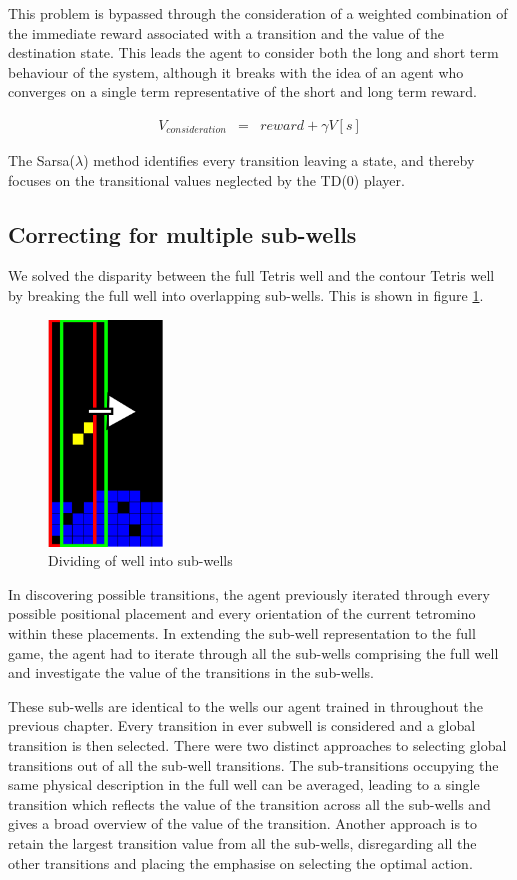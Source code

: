 \documentclass{rucsthesis}
\begin{document}
This problem is bypassed through the consideration of a weighted combination of the immediate reward associated with a transition and the value of the destination state. This leads the agent to consider both the long and short term behaviour of the system, although it breaks with the idea of an agent who converges on a single term representative of the short and long term reward.

\begin{eqnarray*}
V_{consideration} & = & reward + \gamma V[s]
\end{eqnarray*} 
 
The Sarsa($\lambda$) method identifies every transition leaving a state, and thereby focuses on the transitional values neglected by the TD(0) player.

\subsection{Correcting for multiple sub-wells}

We solved the disparity between the full Tetris well and the contour Tetris well by breaking the full well into overlapping sub-wells. This is shown in figure \ref{fig:subwells}.

\begin{figure}[h]
\centering
\includegraphics[width=1.2in]{decomposedwell.png}
\caption{Dividing of well into sub-wells}
\label{fig:subwells}
\end{figure}

In discovering possible transitions, the agent previously iterated through every possible positional placement and every orientation of the current tetromino within these placements. In extending the sub-well representation to the full game, the agent had to iterate through all the sub-wells comprising the full well and investigate the value of the transitions in the sub-wells.

These sub-wells are identical to the wells our agent trained in throughout the previous chapter. Every transition in ever subwell is considered and a global transition is then selected. There were two distinct approaches to selecting global transitions out of all the sub-well transitions. The sub-transitions occupying the same physical description in the full well can be averaged, leading to a single transition which reflects the value of the transition across all the sub-wells and gives a broad overview of the value of the transition. Another approach is to retain the largest transition value from all the sub-wells, disregarding all the other transitions and placing the emphasise on selecting the optimal action.
\end{document}
